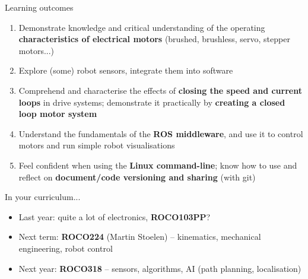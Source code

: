 \documentclass[compress]{beamer}
\begin{document}
\begin{frame}{Learning outcomes}
    \begin{enumerate}
        \item<+-> Demonstrate knowledge and critical understanding of the operating
            \textbf{characteristics of electrical motors} (brushed, brushless,
            servo, stepper motors...)
        \item<+-> Explore (some) robot sensors, integrate them into software
        \item<+-> Comprehend and characterise the effects of \textbf{closing the speed and current
            loops} in drive systems; demonstrate it practically by \textbf{creating a
            closed loop motor system}
        \item<+-> Understand the fundamentals of the \textbf{ROS middleware},
            and use it to control motors and run simple robot visualisations
        \item<+-> Feel confident when using the \textbf{Linux command-line}; know how to use and reflect on \textbf{document/code versioning and
            sharing} (with git)
    \end{enumerate}
\end{frame}

\begin{frame}{In your curriculum...}
    \begin{itemize}
        \item Last year: quite a lot of electronics, \textbf{ROCO103PP}?
        \item Next term: \textbf{ROCO224} (Martin Stoelen) -- kinematics, mechanical engineering,
            robot control
        \item Next year: \textbf{ROCO318} -- sensors, algorithms, AI (path
            planning, localisation)
    \end{itemize}
\end{frame}
\end{document}
